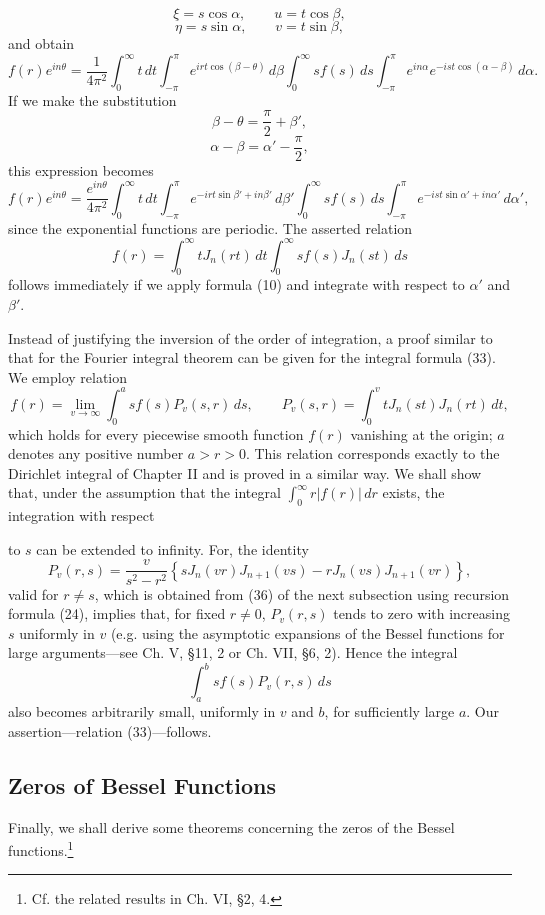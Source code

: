 \[
\xi=s\cos\alpha,\qquad u=t\cos\beta,
\]
\[
\eta=s\sin\alpha,\qquad v=t\sin\beta,
\]
and obtain
\[
f(r)e^{in\theta}=\frac1{4\pi^2}\int_0^\infty t\,dt
\int_{-\pi}^{\pi}e^{irt\cos(\beta-\theta)}\,d\beta
\int_0^\infty s f(s)\,ds
\int_{-\pi}^{\pi}e^{in\alpha}e^{-ist\cos(\alpha-\beta)}\,d\alpha.
\]
If we make the substitution
\[
\beta-\theta=\frac\pi2+\beta',
\]
\[
\alpha-\beta=\alpha'-\frac\pi2,
\]
this expression becomes
\[
f(r)e^{in\theta}=\frac{e^{in\theta}}{4\pi^2}\int_0^\infty t\,dt
\int_{-\pi}^{\pi}e^{-irt\sin\beta'+in\beta'}\,d\beta'
\int_0^\infty s f(s)\,ds
\int_{-\pi}^{\pi}e^{-ist\sin\alpha'+in\alpha'}\,d\alpha',
\]
since the exponential functions are periodic. The asserted relation
\[
f(r)=\int_0^\infty tJ_n(rt)\,dt\int_0^\infty s f(s)J_n(st)\,ds
\]
follows immediately if we apply formula (10) and integrate with respect to $\alpha'$ and $\beta'$.

Instead of justifying the inversion of the order of integration, a proof similar to that for the Fourier integral theorem can be given for the integral formula (33). We employ relation
\begin{equation}\tag{34}
 f(r)=\lim_{v\to\infty}\int_0^a s f(s)P_v(s,r)\,ds,
 \qquad
 P_v(s,r)=\int_0^v tJ_n(st)J_n(rt)\,dt,
\end{equation}
which holds for every piecewise smooth function $f(r)$ vanishing at the origin; $a$ denotes any positive number $a>r>0$. This relation corresponds exactly to the Dirichlet integral of Chapter II and is proved in a similar way. We shall show that, under the assumption that the integral $\int_0^\infty r|f(r)|\,dr$ exists, the integration with respect

to $s$ can be extended to infinity. For, the identity
\begin{equation}\tag{35}
P_v(r,s)=\frac{v}{s^2-r^2}
\left\{sJ_n(vr)J_{n+1}(vs)-rJ_n(vs)J_{n+1}(vr)\right\},
\end{equation}
valid for $r\ne s$, which is obtained from (36) of the next subsection using recursion formula (24), implies that, for fixed $r\ne0$, $P_v(r,s)$ tends to zero with increasing $s$ uniformly in $v$ (e.g. using the asymptotic expansions of the Bessel functions for large arguments---see Ch. V, \S11, 2 or Ch. VII, \S6, 2). Hence the integral
\[
\int_a^b s f(s)P_v(r,s)\,ds
\]
also becomes arbitrarily small, uniformly in $v$ and $b$, for sufficiently large $a$. Our assertion---relation (33)---follows.

\subsection{Zeros of Bessel Functions}
Finally, we shall derive some theorems concerning the zeros of the Bessel functions.\footnote{Cf. the related results in Ch. VI, \S2, 4.}


